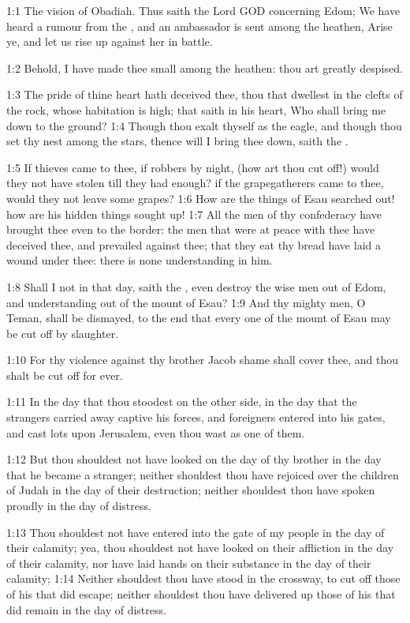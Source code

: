 

1:1 The vision of Obadiah. Thus saith the Lord GOD concerning Edom; We have heard a rumour from the \LORD, and an ambassador is sent among the heathen, Arise ye, and let us rise up against her in battle.

1:2 Behold, I have made thee small among the heathen: thou art greatly despised.

1:3 The pride of thine heart hath deceived thee, thou that dwellest in the clefts of the rock, whose habitation is high; that saith in his heart, Who shall bring me down to the ground?  1:4 Though thou exalt thyself as the eagle, and though thou set thy nest among the stars, thence will I bring thee down, saith the \LORD.

1:5 If thieves came to thee, if robbers by night, (how art thou cut off!)  would they not have stolen till they had enough? if the grapegatherers came to thee, would they not leave some grapes?  1:6 How are the things of Esau searched out! how are his hidden things sought up!  1:7 All the men of thy confederacy have brought thee even to the border: the men that were at peace with thee have deceived thee, and prevailed against thee; that they eat thy bread have laid a wound under thee: there is none understanding in him.

1:8 Shall I not in that day, saith the \LORD, even destroy the wise men out of Edom, and understanding out of the mount of Esau?  1:9 And thy mighty men, O Teman, shall be dismayed, to the end that every one of the mount of Esau may be cut off by slaughter.

1:10 For thy violence against thy brother Jacob shame shall cover thee, and thou shalt be cut off for ever.

1:11 In the day that thou stoodest on the other side, in the day that the strangers carried away captive his forces, and foreigners entered into his gates, and cast lots upon Jerusalem, even thou wast as one of them.

1:12 But thou shouldest not have looked on the day of thy brother in the day that he became a stranger; neither shouldest thou have rejoiced over the children of Judah in the day of their destruction; neither shouldest thou have spoken proudly in the day of distress.

1:13 Thou shouldest not have entered into the gate of my people in the day of their calamity; yea, thou shouldest not have looked on their affliction in the day of their calamity, nor have laid hands on their substance in the day of their calamity; 1:14 Neither shouldest thou have stood in the crossway, to cut off those of his that did escape; neither shouldest thou have delivered up those of his that did remain in the day of distress.

